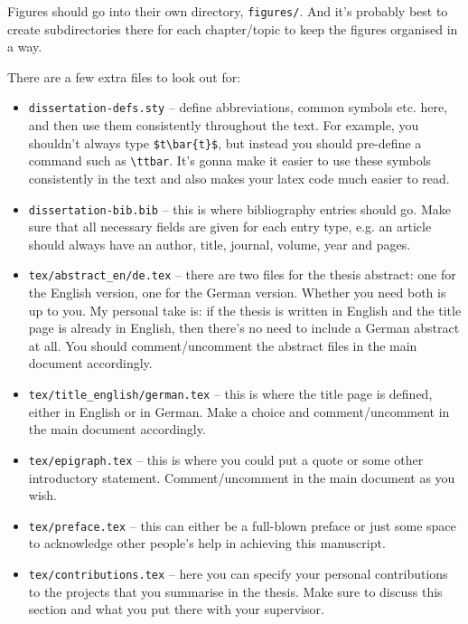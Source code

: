 Figures should go into their own directory, \texttt{figures/}.
And it's probably best to create subdirectories there for each chapter/topic to keep the figures organised in a way.

There are a few extra files to look out for:
%
\begin{itemize}
  \item \texttt{dissertation-defs.sty} -- define abbreviations, common symbols etc. here, and then use them consistently throughout the text. For example, you shouldn't always type \texttt{\$t\textbackslash bar\{t\}\$}, but instead you should pre-define a command such as \texttt{\textbackslash ttbar}. It's gonna make it easier to use these symbols consistently in the text and also makes your latex code much easier to read.
  \item \texttt{dissertation-bib.bib} -- this is where bibliography entries should go. Make sure that all necessary fields are given for each entry type, e.g. an article should always have an author, title, journal, volume, year and pages.
  \item \texttt{tex/abstract\_en/de.tex} -- there are two files for the thesis abstract: one for the English version, one for the German version. Whether you need both is up to you. My personal take is: if the thesis is written in English and the title page is already in English, then there's no need to include a German abstract at all. You should comment/uncomment the abstract files in the main document accordingly.
  \item \texttt{tex/title\_english/german.tex} -- this is where the title page is defined, either in English or in German. Make a choice and comment/uncomment in the main document accordingly.
  \item \texttt{tex/epigraph.tex} -- this is where you could put a quote or some other introductory statement. Comment/uncomment in the main document as you wish.
  \item \texttt{tex/preface.tex} -- this can either be a full-blown preface or just some space to acknowledge other people's help in achieving this manuscript.
  \item \texttt{tex/contributions.tex} -- here you can specify your personal contributions to the projects that you summarise in the thesis. Make sure to discuss this section and what you put there with your supervisor.
\end{itemize}
